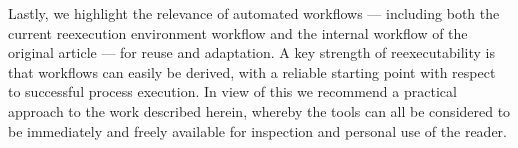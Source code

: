 Lastly, we highlight the relevance of automated workflows — including both the current reexecution environment workflow and the internal workflow of the original article — for reuse and adaptation.
A key strength of reexecutability is that workflows can easily be derived, with a reliable starting point with respect to successful process execution.
In view of this we recommend a practical approach to the work described herein, whereby the tools can all be considered to be immediately and freely available for inspection and personal use of the reader.




%
%
%

